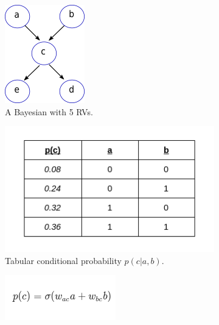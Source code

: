 \begin{figure}
	\centering
	\begin{subfigure}[t]{.33\textwidth}
  		\centering
  		\includegraphics[width=.6\linewidth]{imgs/bayesnet1.png}
  		\caption{A Bayesian with 5 RVs.}
  		\label{fig:sub1}
	\end{subfigure}%
	\begin{subfigure}[t]{.33\textwidth}
  		\centering
  		\includegraphics[width=.9\linewidth]{imgs/bayesnet2.png}
  		\caption{Tabular conditional probability $p(c |a , b)$.}
  		\label{fig:sub2}
	\end{subfigure}
	\begin{subfigure}[t]{.33\textwidth}
  		\centering
  		\includegraphics[width=.7\linewidth]{imgs/bayesnet3.png}

\end{subfigure}
\end{figure}
